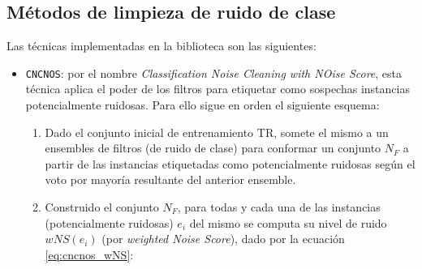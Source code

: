 \documentclass[print, color]{ugrTFG}
\begin{document}
 \subsection{Métodos de limpieza de ruido de clase}
 Las técnicas implementadas en la biblioteca son las siguientes:
 \begin{itemize}
     
     \item  \texttt{CNCNOS}: por el nombre \textit{Classification Noise Cleaning with NOise Score}, esta técnica aplica el poder de los filtros para etiquetar como sospechas instancias potencialmente ruidosas. Para ello sigue en orden el siguiente esquema:
        \begin{enumerate}
            
            \item Dado el conjunto inicial de entrenamiento TR, somete el mismo a un ensembles de filtros (de ruido de clase) para conformar un conjunto $N_F$ a partir de las instancias etiquetadas como potencialmente ruidosas según el voto por mayoría resultante del anterior ensemble.

            \item Construido el conjunto $N_F$, para todas y cada una de las instancias (potencialmente ruidosas) $e_i$ del mismo se computa su nivel de ruido $wNS(e_i)$ (por \textit{weighted Noise Score}), dado por la ecuación \ref{eq:cncnos_wNS}:


\end{enumerate}
\end{itemize}
\end{document}
